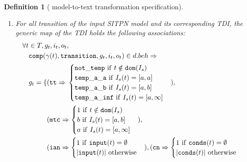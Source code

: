 \documentclass[pdflatex,sn-mathphys]{sn-jnl}%
\theoremstyle{thmstyleone}%
\theoremstyle{thmstyletwo}%
\theoremstyle{thmstylethree}%
\newtheorem{definition}{Definition}%
\begin{document}
\begin{definition}[\hilecop{} model-to-text transformation specification]
\begin{enumerate}[resume]
  \item\label{it:tdi-gen-map} For all transition of the input SITPN model and its
    corresponding TDI, the generic map of the TDI holds the following
    associations:
    \begin{equation*}
      \begin{aligned}[t]
        \forall{}t&\in{}T,g_t,i_t,o_t, \\
                  & \mathtt{comp}(\gamma(t),\mathtt{transition},g_t,i_t,o_t)\in{}d.beh\Rightarrow \\
                  &
                    \begin{aligned}[t]
                      g_t=\{&(\mathtt{tt}\Rightarrow{}
                      \begin{cases}
                        \mathtt{not\_temp}~\mathrm{if}~t\notin{}\mathtt{dom}(I_s) \\
                        \mathtt{temp\_a\_a}~\mathrm{if}~I_s(t)=[a,a] \\
                        \mathtt{temp\_a\_b}~\mathrm{if}~I_s(t)=[a,b] \\
                        \mathtt{temp\_a\_inf}~\mathrm{if}~I_s(t)=[a,\infty] \\
                      \end{cases}),\\
                      & (\mathtt{mtc}\Rightarrow
                      \begin{cases}
                        1~\mathrm{if}~t\notin{}\mathtt{dom}(I_s) \\
                        b~\mathrm{if}~I_s(t)=[a,b] \\
                        a~\mathrm{if}~I_s(t)=[a,\infty] \\
                      \end{cases}), \\
                      & (\mathtt{ian}\Rightarrow
                        \begin{cases}
                          1~\mathrm{if}~\mathtt{input}(t)=\emptyset \\
                          \vert{}\mathtt{input}(t)\vert~\mathrm{otherwise} \\
                        \end{cases}), 
                      (\mathtt{cn}\Rightarrow
                      \begin{cases}
                        1~\mathrm{if}~\mathtt{conds}(t)=\emptyset \\
                        \vert{}\mathtt{conds}(t)\vert~\mathrm{otherwise} \\

\end{cases}
\end{aligned}
\end{aligned}
\end{equation*}
\end{enumerate}
\end{definition}
\end{document}
